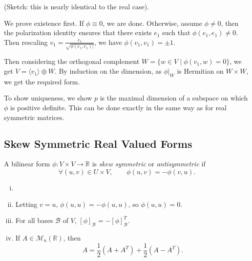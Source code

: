 \documentclass[12pt]{article}
\begin{document}
\begin{proofbox}
	(Sketch: this is nearly identical to the real case).

	We prove existence first. If $\phi \equiv 0$, we are done. Otherwise, assume $\phi \neq 0$, then the polarization identity ensures that there exists $e_1$ such that $\phi(e_1, e_1) \neq 0$. Then rescaling $v_1 = \frac{e_1}{\sqrt{\phi(e_1, e_1)|}}$, we have $\phi(v_1, v_1) = \pm 1$.

	Then considering the orthogonal complement $W = \{ w \in V \mid \phi(v_1, w) = 0\}$, we get $V = \langle v_1 \rangle \oplus W$. By induction on the dimension, as $\phi|_{W}$ is Hermitian on $W \times W$, we get the required form.

	To show uniqueness, we show $p$ is the maximal dimension of a subspace on which $\phi$ is positive definite. This can be done exactly in the same way as for real symmetric matrices.
\end{proofbox}

\subsection{Skew Symmetric Real Valued Forms}
\label{sub:skew_symmetric_real_valued_forms}

\begin{definition}
	A bilinear form $\phi : V \times V \to \mathbb{R}$ is \textit{skew symmetric} or \textit{antisymmetric} if
	\[
	\forall (u, v) \in U \times V, \qquad \phi(u, v) = - \phi(v, u)
	.\]
\end{definition}

\begin{remark}
	\begin{enumerate}[(i)]
		\item[]
		\item Letting $v = u$, $\phi(u, u) = - \phi(u, u)$, so $\phi(u, u) = 0$.
		\item For all bases $\mathcal{B}$ of $V$, $[\phi]_{\mathcal{B}} = - [\phi]_{\mathcal{B}}^{T}$.
		\item If $A \in \mathcal{M}_n(\mathbb{R})$, then
			\[
			A = \frac{1}{2}(A + A^{T}) + \frac{1}{2}(A - A^{T})
			.\]
	\end{enumerate}
\end{remark}
\end{document}
